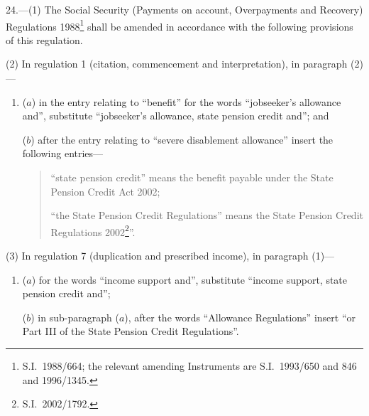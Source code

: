 \documentclass[12pt,a4paper]{article}
\begin{document}
\renewcommand\parthead{--- Part V}

24.---(1)  The Social Security (Payments on account, Overpayments and Recovery) Regulations 1988\footnote{S.I.\ 1988/664; the relevant amending Instruments are S.I.\ 1993/650 and 846 and 1996/1345.} shall be amended in accordance with the following provisions of this regulation.

(2) In regulation 1 (citation, commencement and interpretation), in paragraph (2)—
\begin{enumerate}\item[]
($a$) in the entry relating to “benefit” for the words “jobseeker’s allowance and”, substitute “jobseeker’s allowance, state pension credit and”; and

($b$) after the entry relating to “severe disablement allowance” insert the following entries—
\begin{quotation}
“state pension credit” means the benefit payable under the State Pension Credit Act 2002;

“the State Pension Credit Regulations” means the State Pension Credit Regulations 2002\footnote{S.I.\ 2002/1792.}”.
\end{quotation}
\end{enumerate}

(3) In regulation 7 (duplication and prescribed income), in paragraph (1)—
\begin{enumerate}\item[]
($a$) for the words “income support and”, substitute “income support, state pension credit and”;

($b$) in sub-paragraph ($a$), after the words “Allowance Regulations” insert “or Part III of the State Pension Credit Regulations”.
\end{enumerate}
\end{document}
